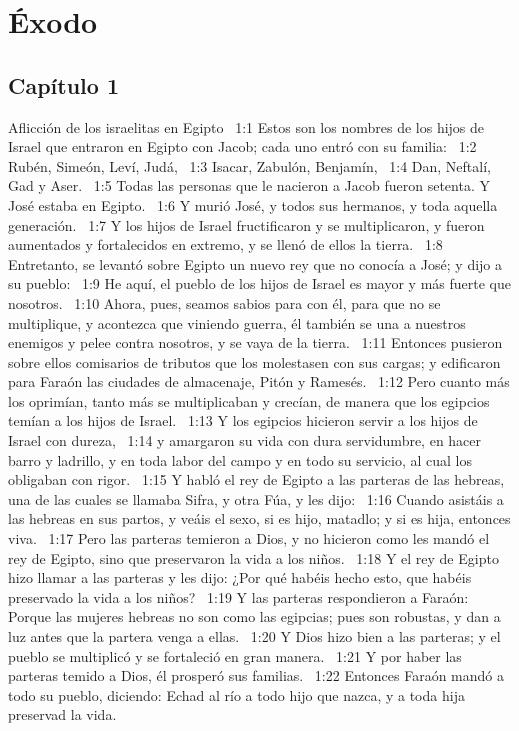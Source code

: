 \chapter{Éxodo}


\section*{Capítulo 1}
Aflicción de los israelitas en Egipto  
1:1 Estos son los nombres de los hijos de Israel que entraron en Egipto con Jacob; cada uno entró con su familia:  
1:2 Rubén, Simeón, Leví, Judá,  
1:3 Isacar, Zabulón, Benjamín,  
1:4 Dan, Neftalí, Gad y Aser.  
1:5 Todas las personas que le nacieron a Jacob fueron setenta. Y José estaba en Egipto.  
1:6 Y murió José, y todos sus hermanos, y toda aquella generación.  
1:7 Y los hijos de Israel fructificaron y se multiplicaron, y fueron aumentados y fortalecidos en extremo, y se llenó de ellos la tierra.  
1:8 Entretanto, se levantó sobre Egipto un nuevo rey que no conocía a José; y dijo a su pueblo:  
1:9 He aquí, el pueblo de los hijos de Israel es mayor y más fuerte que nosotros.  
1:10 Ahora, pues, seamos sabios para con él, para que no se multiplique, y acontezca que viniendo guerra, él también se una a nuestros enemigos y pelee contra nosotros, y se vaya de la tierra.  
1:11 Entonces pusieron sobre ellos comisarios de tributos que los molestasen con sus cargas; y edificaron para Faraón las ciudades de almacenaje, Pitón y Ramesés.  
1:12 Pero cuanto más los oprimían, tanto más se multiplicaban y crecían, de manera que los egipcios temían a los hijos de Israel.  
1:13 Y los egipcios hicieron servir a los hijos de Israel con dureza,  
1:14 y amargaron su vida con dura servidumbre, en hacer barro y ladrillo, y en toda labor del campo y en todo su servicio, al cual los obligaban con rigor.  
1:15 Y habló el rey de Egipto a las parteras de las hebreas, una de las cuales se llamaba Sifra, y otra Fúa, y les dijo:  
1:16 Cuando asistáis a las hebreas en sus partos, y veáis el sexo, si es hijo, matadlo; y si es hija, entonces viva.  
1:17 Pero las parteras temieron a Dios, y no hicieron como les mandó el rey de Egipto, sino que preservaron la vida a los niños.  
1:18 Y el rey de Egipto hizo llamar a las parteras y les dijo: ¿Por qué habéis hecho esto, que habéis preservado la vida a los niños?  
1:19 Y las parteras respondieron a Faraón: Porque las mujeres hebreas no son como las egipcias; pues son robustas, y dan a luz antes que la partera venga a ellas.  
1:20 Y Dios hizo bien a las parteras; y el pueblo se multiplicó y se fortaleció en gran manera.  
1:21 Y por haber las parteras temido a Dios, él prosperó sus familias.  
1:22 Entonces Faraón mandó a todo su pueblo, diciendo: Echad al río a todo hijo que nazca, y a toda hija preservad la vida.  
